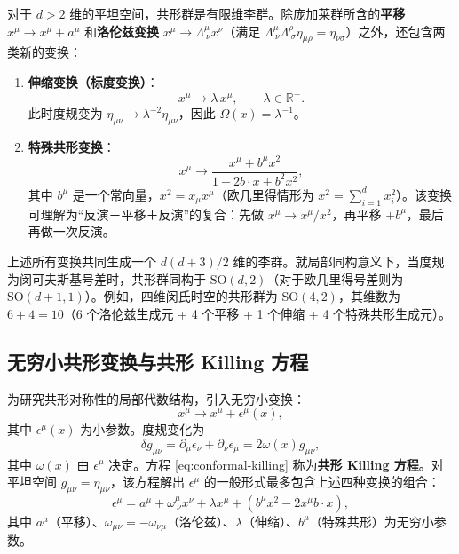 对于 $d>2$ 维的平坦空间，共形群是有限维李群。除庞加莱群所含的\textbf{平移} $x^\mu \to x^\mu + a^\mu$ 和\textbf{洛伦兹变换} $x^\mu \to \Lambda^\mu_{\ \nu} x^\nu$（满足 $\Lambda^\mu_{\ \nu}\Lambda^\rho_{\ \sigma}\eta_{\mu\rho}=\eta_{\nu\sigma}$）之外，还包含两类新的变换：

\begin{enumerate}
    \item \textbf{伸缩变换（标度变换）}：
    \begin{equation}
    x^\mu \to \lambda\, x^\mu,\qquad \lambda \in \mathbb{R}^+.
    \end{equation}
    此时度规变为 $\eta_{\mu\nu} \to \lambda^{-2}\eta_{\mu\nu}$，因此 $\Omega(x)=\lambda^{-1}$。
    \item \textbf{特殊共形变换}：
    \begin{equation}
    x^\mu \to \frac{x^\mu + b^\mu x^2}{1+2b\cdot x + b^2 x^2},
    \end{equation}
    其中 $b^\mu$ 是一个常向量，$x^2 = x_\mu x^\mu$（欧几里得情形为 $x^2 = \sum_{i=1}^d x_i^2$）。该变换可理解为“反演＋平移＋反演”的复合：先做 $x^\mu \to x^\mu/x^2$，再平移 $+b^\mu$，最后再做一次反演。
\end{enumerate}

上述所有变换共同生成一个 $d(d+3)/2$ 维的李群。就局部同构意义下，当度规为闵可夫斯基号差时，共形群同构于 $\mathrm{SO}(d,2)$（对于欧几里得号差则为 $\mathrm{SO}(d+1,1)$）。例如，四维闵氏时空的共形群为 $\mathrm{SO}(4,2)$，其维数为 $6+4=10$（6 个洛伦兹生成元 + 4 个平移 + 1 个伸缩 + 4 个特殊共形生成元）。

\subsection*{无穷小共形变换与共形 Killing 方程}

为研究共形对称性的局部代数结构，引入无穷小变换：
\begin{equation}
x^\mu \to x^\mu + \epsilon^\mu(x),
\end{equation}
其中 $\epsilon^\mu(x)$ 为小参数。度规变化为
\begin{equation}
\delta g_{\mu\nu} = \partial_\mu \epsilon_\nu + \partial_\nu \epsilon_\mu = 2\omega(x) g_{\mu\nu},
\label{eq:conformal-killing}
\end{equation}
其中 $\omega(x)$ 由 $\epsilon^\mu$ 决定。方程 \eqref{eq:conformal-killing} 称为\textbf{共形 Killing 方程}。对平坦空间 $g_{\mu\nu}=\eta_{\mu\nu}$，该方程解出 $\epsilon^\mu$ 的一般形式最多包含上述四种变换的组合：
\begin{equation}
\epsilon^\mu = a^\mu + \omega^\mu_{\ \nu} x^\nu + \lambda x^\mu + (b^\mu x^2 - 2 x^\mu b\cdot x),
\label{eq:infinitesimal}
\end{equation}
其中 $a^\mu$（平移）、$\omega_{\mu\nu} = -\omega_{\nu\mu}$（洛伦兹）、$\lambda$（伸缩）、$b^\mu$（特殊共形）为无穷小参数。

